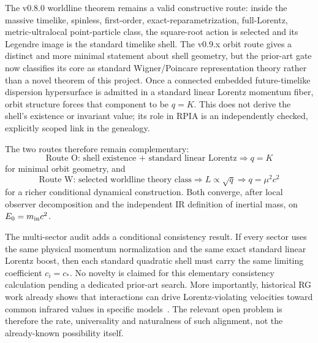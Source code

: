 \documentclass[11pt,a4paper]{article}
\begin{document}
The v0.8.0 worldline theorem remains a valid constructive route: inside the massive timelike, spinless, first-order, exact-reparametrization, full-Lorentz, metric-ultralocal point-particle class, the square-root action is selected and its Legendre image is the standard timelike shell.  The v0.9.x orbit route gives a distinct and more minimal statement about shell geometry, but the prior-art gate now classifies its core as standard Wigner/Poincare representation theory rather than a novel theorem of this project.  Once a connected embedded future-timelike dispersion hypersurface is admitted in a standard linear Lorentz momentum fiber, orbit structure forces that component to be $q=K$.  This does not derive the shell's existence or invariant value; its role in RPIA is an independently checked, explicitly scoped link in the genealogy.

The two routes therefore remain complementary:
\begin{equation}
\boxed{\text{Route O: shell existence + standard linear Lorentz}\Rightarrow q=K}
\end{equation}
for minimal orbit geometry, and
\begin{equation}
\boxed{\text{Route W: selected worldline theory class}\Rightarrow L\propto\sqrt q\Rightarrow q=\mu^2c^2}
\end{equation}
for a richer conditional dynamical construction.  Both converge, after local observer decomposition and the independent IR definition of inertial mass, on $E_0=m_{\rm in}c^2$.

The multi-sector audit adds a conditional consistency result.  If every sector uses the same physical momentum normalization and the same exact standard linear Lorentz boost, then each standard quadratic shell must carry the same limiting coefficient $c_i=c_*$.  No novelty is claimed for this elementary consistency calculation pending a dedicated prior-art search.  More importantly, historical RG work already shows that interactions can drive Lorentz-violating velocities toward common infrared values in specific models~\cite{nielsen1978,chadha1983,anber2011}.  The relevant open problem is therefore the rate, universality and naturalness of such alignment, not the already-known possibility itself.
\end{document}
